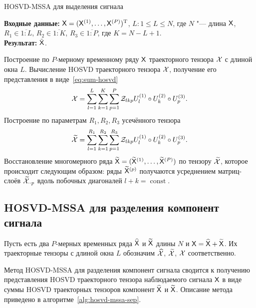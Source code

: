 \documentclass[specialist,
    substylefile = spbu_report.rtx,
    subf,href,colorlinks=true, 12pt]{disser}
\theoremstyle{plain}
\theoremstyle{definition}
\theoremstyle{remark}
\newcommand{\Input}{\textbf{Входные данные: }}
\newcommand{\Output}{\textbf{Результат: }}
\begin{document}
    \begin{algorithm}[!ht]
        \caption{HOSVD-MSSA для выделения сигнала}
        \label{alg:hosvd-mssa}
        \Input $\mathsf{X} = (\mathsf{X}^{(1)}, \ldots, \mathsf{X}^{(P)})^{\mathrm{T}}$,
        $L: 1\leqslant L \leqslant N$, где $N$ "--- длина $\mathsf{X}$, $R_1 \in \overline{1:L}$,
        $R_2 \in \overline{1:K}$, $R_3 \in \overline{1:P}$, где $K = N-L+1$.\\
        \Output $\tilde{\mathsf{X}}$.\\
        \begin{algorithmic}[1]
            \State Построение по $P$-мерному временному ряду $\mathsf{X}$ траекторного тензора $\mathcal{X}$ с длиной окна $L$.
            \State Вычисление HOSVD траекторного тензора $\mathcal{X}$, получение его представления в виде~\eqref{eq:sum-hosvd}
            \begin{equation}
                \mathcal{X} = \sum_{l=1}^{L} \sum_{k=1}^{K} \sum_{p=1}^{P} \mathcal{Z}_{lkp} U_l^{(1)}\circ U_k^{(2)} \circ U_p^{(3)}.
                \label{eq:hosvd-mssa}
            \end{equation}
            \State Построение по параметрам $R_1, R_2, R_3$ усечённого тензора
            \[
                \widetilde{\mathcal{X}}=\sum_{l=1}^{R_1} \sum_{k=1}^{R_2} \sum_{p=1}^{R_3} \mathcal{Z}_{lkp} U_l^{(1)}\circ U_k^{(2)} \circ U_p^{(3)}.
            \]
            \State \label{step:hosvd-mssa-sep-restoration} Восстановление многомерного ряда $\widetilde{\mathsf{X}}=(\widetilde{\mathsf{X}}^{(1)}, \ldots, \widetilde{\mathsf{X}}^{(P)})$ по тензору
            $\widetilde{\mathcal{X}}$, которое происходит следующим образом:
            ряды $\widetilde{\mathsf{X}}^{(p)}$ получаются усреднением матриц-слоёв $\widetilde{\mathcal{X}}_{\cdot \cdot p}$ вдоль
            побочных диагоналей $l+k=\operatorname{const}$.
        \end{algorithmic}
    \end{algorithm}
    
    

    \subsection{HOSVD-MSSA для разделения компонент сигнала}\label{subsec:Tensor-MSSA-sep-method-description}
    Пусть есть два $P$-мерных временных ряда $\widehat{\mathsf{X}}$ и $\widetilde{\mathsf{X}}$ длины $N$ и 
    $\mathsf{X} = \widehat{\mathsf{X}} + \widetilde{\mathsf{X}}$. Их траекторные тензоры с длиной окна $L$ обозначим
    $\widehat{\mathcal{X}}$, $\widetilde{\mathcal{X}}$, $\mathcal{X}$ соответственно.
    
    Метод HOSVD-MSSA для разделения компонент сигнала сводится к получению представления HOSVD траекторного тензора 
    наблюдаемого сигнала $\mathsf{X}$ в виде суммы HOSVD траекторных тензоров компонент $\widehat{\mathsf{X}}$ и $\widetilde{\mathsf{X}}$.
    Описание метода приведено в алгоритме~\ref{alg:hosvd-mssa-sep}.
    
\end{document}

